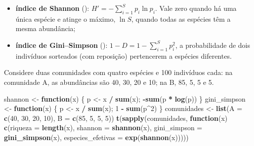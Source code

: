 \documentclass[
]{book}
\newenvironment{Shaded}{\begin{snugshade}}{\end{snugshade}}
\newcommand{\AttributeTok}[1]{\textcolor[rgb]{0.13,0.29,0.53}{#1}}
\newcommand{\ControlFlowTok}[1]{\textcolor[rgb]{0.13,0.29,0.53}{\textbf{#1}}}
\newcommand{\DecValTok}[1]{\textcolor[rgb]{0.00,0.00,0.81}{#1}}
\newcommand{\FunctionTok}[1]{\textcolor[rgb]{0.13,0.29,0.53}{\textbf{#1}}}
\newcommand{\NormalTok}[1]{#1}
\newcommand{\OtherTok}[1]{\textcolor[rgb]{0.56,0.35,0.01}{#1}}
\newcommand{\SpecialCharTok}[1]{\textcolor[rgb]{0.81,0.36,0.00}{\textbf{#1}}}
\providecommand{\tightlist}{%
  \setlength{\itemsep}{0pt}\setlength{\parskip}{0pt}}
\begin{document}
\begin{itemize}
\tightlist
\item
  \textbf{índice de Shannon} (): \(H' = -\sum_{i=1}^{S} p_i \ln p_i\). Vale zero quando há uma única espécie e atinge o máximo, \(\ln S\), quando todas as espécies têm a mesma abundância;
\item
  \textbf{índice de Gini--Simpson} (): \(1 - D = 1 - \sum_{i=1}^{S} p_i^2\), a probabilidade de dois indivíduos sorteados (com reposição) pertencerem a espécies diferentes.
\end{itemize}

Considere duas comunidades com quatro espécies e 100 indivíduos cada: na comunidade A, as abundâncias são 40, 30, 20 e 10; na B, 85, 5, 5 e 5.

\begin{Shaded}
\begin{Highlighting}[]
\NormalTok{shannon }\OtherTok{\textless{}{-}} \ControlFlowTok{function}\NormalTok{(x) \{ p }\OtherTok{\textless{}{-}}\NormalTok{ x }\SpecialCharTok{/} \FunctionTok{sum}\NormalTok{(x); }\SpecialCharTok{{-}}\FunctionTok{sum}\NormalTok{(p }\SpecialCharTok{*} \FunctionTok{log}\NormalTok{(p)) \}}
\NormalTok{gini\_simpson }\OtherTok{\textless{}{-}} \ControlFlowTok{function}\NormalTok{(x) \{ p }\OtherTok{\textless{}{-}}\NormalTok{ x }\SpecialCharTok{/} \FunctionTok{sum}\NormalTok{(x); }\DecValTok{1} \SpecialCharTok{{-}} \FunctionTok{sum}\NormalTok{(p}\SpecialCharTok{\^{}}\DecValTok{2}\NormalTok{) \}}
\NormalTok{comunidades }\OtherTok{\textless{}{-}} \FunctionTok{list}\NormalTok{(}\AttributeTok{A =} \FunctionTok{c}\NormalTok{(}\DecValTok{40}\NormalTok{, }\DecValTok{30}\NormalTok{, }\DecValTok{20}\NormalTok{, }\DecValTok{10}\NormalTok{), }\AttributeTok{B =} \FunctionTok{c}\NormalTok{(}\DecValTok{85}\NormalTok{, }\DecValTok{5}\NormalTok{, }\DecValTok{5}\NormalTok{, }\DecValTok{5}\NormalTok{))}
\FunctionTok{t}\NormalTok{(}\FunctionTok{sapply}\NormalTok{(comunidades, }\ControlFlowTok{function}\NormalTok{(x)}
  \FunctionTok{c}\NormalTok{(}\AttributeTok{riqueza =} \FunctionTok{length}\NormalTok{(x), }\AttributeTok{shannon =} \FunctionTok{shannon}\NormalTok{(x), }\AttributeTok{gini\_simpson =} \FunctionTok{gini\_simpson}\NormalTok{(x),}
    \AttributeTok{especies\_efetivas =} \FunctionTok{exp}\NormalTok{(}\FunctionTok{shannon}\NormalTok{(x)))))}
\end{Highlighting}
\end{Shaded}
\end{document}
